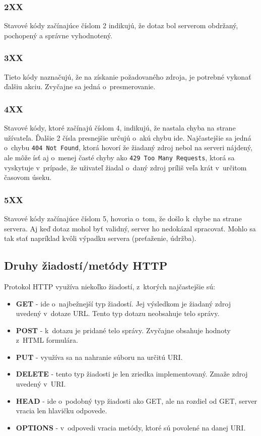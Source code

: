 \documentclass[slovak]{fitthesis}
\begin{document}
\label{2XX}
\subsubsection{2XX}
Stavové kódy začínajúce číslom 2 indikujú, že dotaz bol serverom obdržaný, pochopený a správne vyhodnotený.

\subsubsection{3XX}
Tieto kódy naznačujú, že na získanie požadovaného zdroja, je potrebné vykonať ďalšiu akciu. Zvyčajne sa jedná o~presmerovanie.

\label{4XX}
\subsubsection{4XX}
Stavové kódy, ktoré začínajú číslom 4, indikujú, že nastala chyba na strane užívateľa. Ďalšie 2 čísla presnejšie určujú o~akú chybu ide. Najčastejšie sa jedná o~chybu \texttt{404 Not Found}, ktorá hovorí že žiadaný zdroj nebol na serveri nájdený, ale môže ísť aj o~menej časté chyby ako \texttt{429 Too Many Requests}, ktorá sa vyskytuje v~prípade, že uživateľ žiadal o~daný zdroj príliš veľa krát v~určitom časovom úseku.

\label{5XX}
\subsubsection{5XX}
Stavové kódy začínajúce číslom 5, hovoria o~tom, že došlo k~chybe na strane servera. Aj keď dotaz mohol byť validný, server ho nedokázal spracovať. Mohlo sa tak stať napríklad kvôli výpadku servera (preťaženie, údržba).

\subsection{Druhy žiadostí/metódy HTTP}
Protokol HTTP využíva niekoľko žiadostí, z~ktorých najčastejšie sú:
\begin{itemize}
    \item \textbf{GET} - ide o~najbežnejší typ žiadostí. Jej výsledkom je žiadaný zdroj uvedený v~dotaze URL. Tento typ dotazu neobsahuje telo správy.
    \item \textbf{POST} - k~dotazu je pridané telo správy. Zvyčajne obsahuje hodnoty z~HTML formulára.
    \item \textbf{PUT} - využíva sa na nahranie súboru na určitú URI.
    \item \textbf{DELETE} - tento typ žiadosti je len zriedka implementovaný. Zmaže zdroj uvedený v~URI.
    \item \textbf{HEAD} - ide o~podobný typ žiadosti ako GET, ale na rozdiel od GET, server vracia len hlavičku odpovede.
    \item \textbf{OPTIONS} - v~odpovedi vracia metódy, ktoré sú povolené na danej URI.
\end{itemize}
\end{document}
